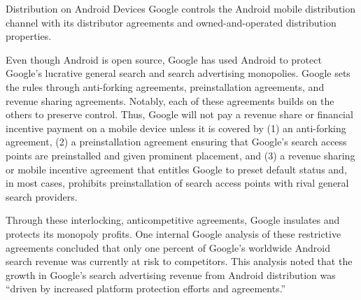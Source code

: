 \documentclass[11pt,b5paper,headings=small]{scrartcl}
\begin{document}



Distribution on Android Devices
Google controls the Android mobile distribution channel with its distributor
agreements and owned-and-operated distribution properties.


Even though Android is open source, Google has used Android to protect
Google’s lucrative general search and search advertising monopolies. Google sets the rules
through anti-forking agreements, preinstallation agreements, and revenue sharing agreements.
Notably, each of these agreements builds on the others to preserve control. Thus, Google will not
pay a revenue share or financial incentive payment on a mobile device unless it is covered by
(1) an anti-forking agreement, (2) a preinstallation agreement ensuring that Google’s search
access points are preinstalled and given prominent placement, and (3) a revenue sharing or
mobile incentive agreement that entitles Google to preset default status and, in most cases,
prohibits preinstallation of search access points with rival general search providers.


Through these interlocking, anticompetitive agreements, Google insulates and
protects its monopoly profits. One internal Google analysis of these restrictive agreements
concluded that only one percent of Google’s worldwide Android search revenue was currently at
risk to competitors. This analysis noted that the growth in Google’s search advertising revenue
from Android distribution was “driven by increased platform protection efforts and agreements.”
\end{document}
